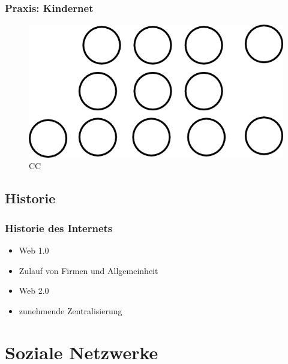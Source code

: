 \documentclass{beamer}
\begin{document}
\begin{frame}
  \frametitle{Praxis: Kindernet}
  \begin{figure}
      \includegraphics[height=0.7\textheight]{img/kindernet.png}
      \caption{CC}
  \end{figure}
\end{frame}

\subsection{Historie}

\begin{frame}
  \frametitle{Historie des Internets}
  \begin{itemize}
    \item<2-> Web 1.0
    \item<3-> Zulauf von Firmen und Allgemeinheit
    \item<4-> Web 2.0
    \item<5-> zunehmende Zentralisierung
  \end{itemize}
\end{frame}

\section{Soziale Netzwerke}
\end{document}
